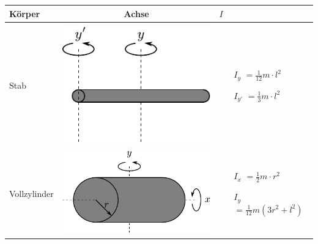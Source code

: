 \newpage
\begin{table}[h!]
\centering
\begin{tabular}{m{2cm} c m{}}
Körper        & Achse        & $I$ \\
\hline
& & \\
Stab &
        \begin{minipage}{0.3\textwidth}
        \centering
        \includegraphics[scale=\traegscale]{../fig/traeg-stab.pdf}
        \end{minipage} &
                \begin{itemize}
                \item[$I_y$]$= \frac{1}{12} m \cdot l^2$
                \item[$I_{y'}$]$= \frac{1}{3} m \cdot l^2$
                \end{itemize} \\
& & \\
Vollzylinder &
        \begin{minipage}{0.3\textwidth}
        \centering
        \includegraphics[scale=\traegscale]{../fig/traeg-vollzylinder.pdf}
        \end{minipage} &
                \begin{itemize}
                \item[$I_x$]$= \frac12 m \cdot r^2$
                \item[$I_y$]$= \frac{1}{12} m \left( 3r^2 + l^2 \right)$

\end{itemize}
\end{tabular}
\end{table}

